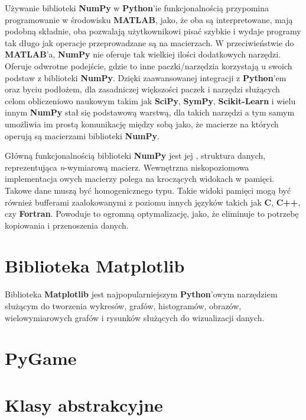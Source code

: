 Używanie biblioteki \textbf{NumPy} w \textbf{Python}'ie funkcjonalnością przypomina programowanie w środowisku \textbf{MATLAB}, jako, że oba są interpretowane, mają podobną składnie, oba pozwalają użytkownikowi pisać szybkie i wydaje programy tak długo jak operacje przeprowadzane są na macierzach. W przeciwieństwie do \textbf{MATLAB}'a, \textbf{NumPy} nie oferuje tak wielkiej ilości dodatkowych narzędzi. Oferuje odwrotne podejście, gdzie to inne paczki/narzędzia korzystają u swoich podstaw z biblioteki \textbf{NumPy}. Dzięki zaawansowanej integracji z \textbf{Python}'em oraz byciu podłożem, dla zasadniczej większości paczek i narzędzi służących celom obliczeniowo naukowym takim jak \textbf{SciPy}, \textbf{SymPy}, \textbf{Scikit-Learn} i wielu innym \textbf{NumPy} stał się podstawową warstwą, dla takich narzędzi a tym samym umożliwia im prostą komunikację między sobą jako, że macierze na których operują są macierzami biblioteki \textbf{NumPy}.

Główną funkcjonalnością biblioteki \textbf{NumPy} jest jej , struktura danych, reprezentująca \textit{n}-wymiarową macierz. Wewnętrzna niskopoziomowa implementacja owych macierzy polega na kroczących widokach w pamięci. Takowe dane muszą być homogenicznego typu. Takie widoki pamięci mogą być również bufferami zaalokowanymi z poziomu innych języków takich jak \textbf{C}, \textbf{C++}, czy \textbf{Fortran}. Powoduje to ogromną optymalizację, jako, że eliminuje to potrzebę kopiowania i przenoszenia danych.



\section{Biblioteka Matplotlib}

Biblioteka \textbf{Matplotlib} \cite{MatplotlibDocumentation} \cite{Matplotlib30Cookbook} \cite{PythonForDataAnalysis} \cite{WikiepdiaMatplotlib} jest najpopularniejszym \textbf{Python}'owym narzędziem służącym do tworzenia wykresów, grafów, histogramów, obrazów, wielowymiarowych grafów i rysunków służących do wizualizacji danych.

\section{PyGame}


\section{Klasy abstrakcyjne}




